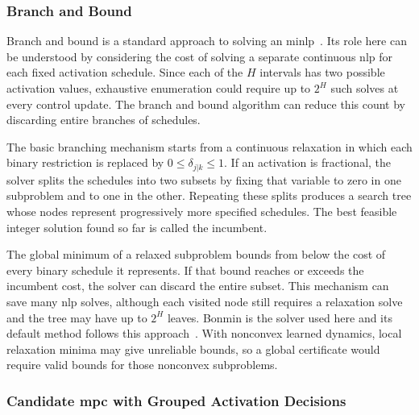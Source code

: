 \subsubsection*{Branch and Bound}

Branch and bound is a standard approach to solving an \ac{minlp}~\cite{Bonami2008}.
Its role here can be understood by considering the cost of solving a separate continuous \ac{nlp} for each fixed activation schedule.
Since each of the $H$ intervals has two possible activation values, exhaustive enumeration could require up to $2^H$ such solves at every control update.
The branch and bound algorithm can reduce this count by discarding entire branches of schedules.

The basic branching mechanism starts from a continuous relaxation in which each binary restriction is replaced by $0\leq\delta_{j|k}\leq1$.
If an activation is fractional, the solver splits the schedules into two subsets by fixing that variable to zero in one subproblem and to one in the other.
Repeating these splits produces a search tree whose nodes represent progressively more specified schedules.
The best feasible integer solution found so far is called the incumbent.

The global minimum of a relaxed subproblem bounds from below the cost of every binary schedule it represents.
If that bound reaches or exceeds the incumbent cost, the solver can discard the entire subset.
This mechanism can save many \ac{nlp} solves, although each visited node still requires a relaxation solve and the tree may have up to $2^H$ leaves.
Bonmin is the solver used here and its default method follows this approach~\cite{BonminManual}.
With nonconvex learned dynamics, local relaxation minima may give unreliable bounds, so a global certificate would require valid bounds for those nonconvex subproblems.

\subsubsection*{Candidate \acs{mpc} with Grouped Activation Decisions}

